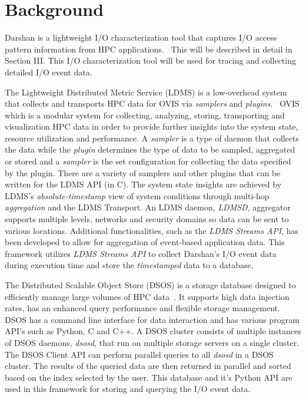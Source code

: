 \section{Background}
\label{sec:background}
Darshan is a lightweight I/O characterization tool that captures I/O access pattern information from HPC applications.~\cite{Darshan} This will be described in detail in Section III. This I/O characterization tool will be used for tracing and collecting detailed I/O event data.

The Lightweight Distributed Metric Service (LDMS) is a low-overhead system that collects and transports HPC data for OVIS via \emph{samplers} and \emph{plugins}.~\cite{ovisweb} OVIS which is a modular system for collecting, analyzing, storing, transporting and visualization HPC data in order to provide further insights into the system state, resource utilization and performance. A \emph{sampler} is a type of daemon that collects the data while the \emph{plugin} determines the type of data to be sampled, aggregated or stored and a \emph{sampler} is the set configuration for collecting the data specified by the plugin. There are a variety of samplers and other plugins that can be written for the LDMS API (in C). The system state insights are achieved by LDMS's \emph{absolute-timestamp} view of system conditions through multi-hop \emph{aggregation} and the LDMS Transport. An LDMS daemon, \emph{LDMSD}, aggregator supports multiple levels, networks and security domains so data can be sent to various locations. Additional functionalities, such as the \emph{LDMS Streams API}, has been developed to allow for aggregation of event-based application data. This framework utilizes \emph{LDMS Streams API} to collect Darshan's I/O event data during execution time and store the \emph{timestamped} data to a database.

The Distributed Scalable Object Store (DSOS) is a storage database designed to efficiently manage large volumes of HPC data~\cite{sosgithub}. It supports high data injection rates, has an enhanced query performance and flexible storage management. DSOS has a command line interface for data interaction and has various program API's such as Python, C and C++. A DSOS cluster consists of multiple instances of DSOS daemons, \emph{dsosd}, that run on multiple storage servers on a single cluster. The DSOS Client API can perform parallel queries to all \emph{dsosd} in a DSOS cluster. The results of the queried data are then returned in parallel and sorted based on the index selected by the user. This database and it's Python API are used in this framework for storing and querying the I/O event data. 

